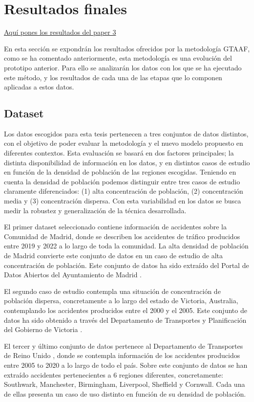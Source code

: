 \documentclass{uathesis-es}
\begin{document}
\section{Resultados finales}

\underline{Aquí pones los resultados del paper 3}

En esta sección se expondrán los resultados ofrecidos por la metodología GTAAF, como se ha comentado anteriormente, esta metodología es una evolución del prototipo anterior. Para ello se analizarán los datos con los que se ha ejecutado este método, y los resultados de cada una de las etapas que lo componen aplicadas a estos datos.

\subsection{Dataset}

Los datos escogidos para esta tesis pertenecen a tres conjuntos de datos distintos, con el objetivo de poder evaluar la metodología y el nuevo modelo propuesto en diferentes contextos. Esta evaluación se basará en dos factores principales; la distinta disponibilidad de información en los datos, y en distintos casos de estudio en función de la densidad de población de las regiones escogidas. Teniendo en cuenta la densidad de población podemos distinguir entre tres casos de estudio claramente diferenciados: (1) alta concentración de población, (2) concentración media y (3) concentración dispersa. Con esta variabilidad en los datos se busca medir la robustez y generalización de la técnica desarrollada.

El primer dataset seleccionado contiene información de accidentes sobre la Comunidad de Madrid, donde se describen los accidentes de tráfico producidos entre 2019 y 2022 a lo largo de toda la comunidad. La alta densidad de población de Madrid convierte este conjunto de datos en un caso de estudio de alta concentración de población. Este conjunto de datos ha sido extraído del Portal de Datos Abiertos del Ayuntamiento de Madrid \cite{InfoDatasetMadrid}. 

El segundo caso de estudio contempla una situación de concentración de población dispersa, concretamente a lo largo del estado de Victoria, Australia, contemplando los accidentes producidos entre el 2000 y el 2005. Este conjunto de datos ha sido obtenido a través del Departamento de Transportes y Planificación del Gobierno de Victoria \cite{InfoDatasetVictoria}.

El tercer y último conjunto de datos pertenece al Departamento de Transportes de Reino Unido \cite{DatasetUK}, donde se contempla información de los accidentes producidos entre 2005 to 2020 a lo largo de todo el país. Sobre este conjunto de datos se han extraído accidentes pertenecientes a 6 regiones diferentes, concretamente: Southwark, Manchester, Birmingham, Liverpool, Sheffield y Cornwall. Cada una de ellas presenta un caso de uso distinto en función de su densidad de población. 
\end{document}
